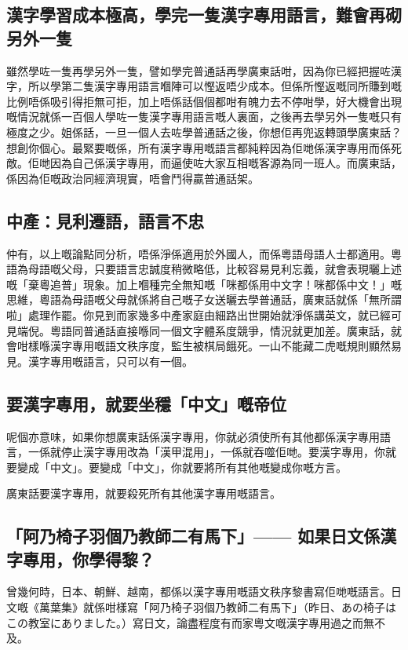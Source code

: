\subsection*{漢字學習成本極高，學完一隻漢字專用語言，難會再砌另外一隻}
雖然學咗一隻再學另外一隻，譬如學完普通話再學廣東話咁，因為你已經把握咗漢字，所以學第二隻漢字專用語言嗰陣可以慳返唔少成本。但係所慳返嘅同所賺到嘅比例唔係吸引得拒無可拒，加上唔係話個個都咁有魄力去不停咁學，好大機會出現嘅情況就係一百個人學咗一隻漢字專用語言嘅人裏面，之後再去學另外一隻嘅只有極度之少。姐係話，一旦一個人去咗學普通話之後，你想佢再兜返轉頭學廣東話？想創你個心。最緊要嘅係，所有漢字專用嘅語言都純粹因為佢哋係漢字專用而係死敵。佢哋因為自己係漢字專用，而逼使咗大家互相嘅客源為同一班人。而廣東話，係因為佢嘅政治同經濟現實，唔會鬥得贏普通話架。

\subsection*{中產：見利遷語，語言不忠}
仲有，以上嘅論點同分析，唔係淨係適用於外國人，而係粵語母語人士都適用。粵語為母語嘅父母，只要語言忠誠度稍微略低，比較容易見利忘義，就會表現曬上述嘅「棄粵追普」現象。加上嗰種完全無知嘅「咪都係用中文字！咪都係中文！」嘅思維，粵語為母語嘅父母就係將自己嘅子女送曬去學普通話，廣東話就係「無所謂啦」處理作罷。你見到而家幾多中產家庭由細路出世開始就淨係講英文，就已經可見端倪。粵語同普通話直接喺同一個文字體系度競爭，情況就更加差。廣東話，就會咁樣喺漢字專用嘅語文秩序度，監生被棋局餓死。一山不能藏二虎嘅規則顯然易見。漢字專用嘅語言，只可以有一個。

\subsection*{要漢字專用，就要坐穩「中文」嘅帝位}
呢個亦意味，如果你想廣東話係漢字專用，你就必須使所有其他都係漢字專用語言，一係就停止漢字專用改為「漢甲混用」，一係就吞噬佢哋。要漢字專用，你就要變成「中文」。要變成「中文」，你就要將所有其他嘅變成你嘅方言。

廣東話要漢字專用，就要殺死所有其他漢字專用嘅語言。

\subsection*{「阿乃椅子羽個乃教師二有馬下」—— 如果日文係漢字專用，你學得黎？}
曾幾何時，日本、朝鮮、越南，都係以漢字專用嘅語文秩序黎書寫佢哋嘅語言。日文嘅《萬葉集》就係咁樣寫「阿乃椅子羽個乃教師二有馬下」（昨日、あの椅子はこの教室にありました。）寫日文，論盡程度有而家粵文嘅漢字專用過之而無不及。

